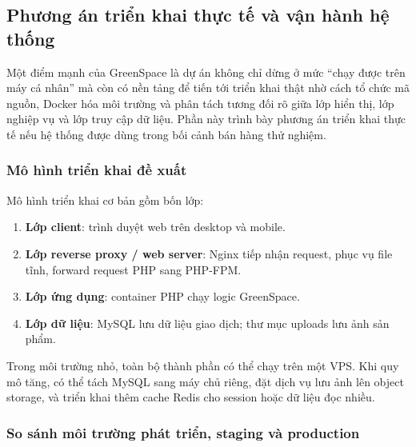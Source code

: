 \documentclass[11pt, a4paper]{article}
\begin{document}
\clearpage
\subsection{Phương án triển khai thực tế và vận hành hệ thống}

Một điểm mạnh của GreenSpace là dự án không chỉ dừng ở mức ``chạy được trên máy
cá nhân'' mà còn có nền tảng để tiến tới triển khai thật nhờ cách tổ chức mã nguồn,
Docker hóa môi trường và phân tách tương đối rõ giữa lớp hiển thị, lớp nghiệp vụ
và lớp truy cập dữ liệu. Phần này trình bày phương án triển khai thực tế nếu hệ thống
được dùng trong bối cảnh bán hàng thử nghiệm.

\subsubsection{Mô hình triển khai đề xuất}

Mô hình triển khai cơ bản gồm bốn lớp:

\begin{enumerate}[leftmargin=*]
    \item \textbf{Lớp client}: trình duyệt web trên desktop và mobile.
    \item \textbf{Lớp reverse proxy / web server}: Nginx tiếp nhận request, phục vụ file tĩnh,
          forward request PHP sang PHP-FPM.
    \item \textbf{Lớp ứng dụng}: container PHP chạy logic GreenSpace.
    \item \textbf{Lớp dữ liệu}: MySQL lưu dữ liệu giao dịch; thư mục uploads lưu ảnh sản phẩm.
\end{enumerate}

Trong môi trường nhỏ, toàn bộ thành phần có thể chạy trên một VPS. Khi quy mô tăng,
có thể tách MySQL sang máy chủ riêng, đặt dịch vụ lưu ảnh lên object storage, và
triển khai thêm cache Redis cho session hoặc dữ liệu đọc nhiều.

\subsubsection{So sánh môi trường phát triển, staging và production}
\end{document}
